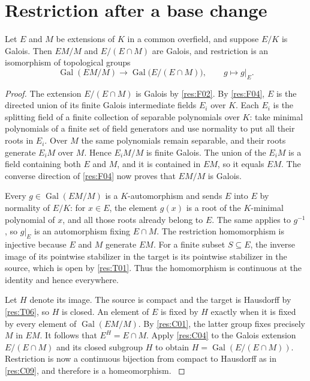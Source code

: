 \section{Restriction after a base change}

\begin{theorem}
\label{res:C10}
Let \(E\) and \(M\) be extensions of \(K\) in a common overfield,
and suppose \(E/K\) is Galois. Then \(EM/M\) and \(E/(E\cap M)\)
are Galois, and restriction is an isomorphism of topological groups
\[
  \operatorname{Gal}(EM/M)
     \longrightarrow \operatorname{Gal}\bigl(E/(E\cap M)\bigr),
     \qquad g\longmapsto g|_E .
\]
\end{theorem}

\begin{proof}
The extension \(E/(E\cap M)\) is Galois by \ref{res:F02}.
By \ref{res:F04}, \(E\) is the directed union of its finite
Galois intermediate fields \(E_i\) over \(K\). Each \(E_i\)
is the splitting field of a finite collection of separable
polynomials over \(K\): take minimal polynomials of a finite
set of field generators and use normality to put all their
roots in \(E_i\). Over \(M\) the same polynomials remain separable,
and their roots generate \(E_iM\) over \(M\). Hence \(E_iM/M\)
is finite Galois. The union of the \(E_iM\) is a field containing
both \(E\) and \(M\), and it is contained in \(EM\), so it equals
\(EM\). The converse direction of \ref{res:F04} now proves
that \(EM/M\) is Galois.

Every \(g\in\operatorname{Gal}(EM/M)\) is a \(K\)-automorphism and
sends \(E\) into \(E\) by normality of \(E/K\): for \(x\in E\),
the element \(g(x)\) is a root of the \(K\)-minimal polynomial of
\(x\), and all those roots already belong to \(E\). The same applies
to \(g^{-1}\), so \(g|_E\) is an automorphism fixing \(E\cap M\).
The restriction homomorphism is injective because \(E\) and \(M\)
generate \(EM\). For a finite subset \(S\subseteq E\), the inverse
image of its pointwise stabilizer in the target is its pointwise
stabilizer in the source, which is open by \ref{res:T01}.
Thus the homomorphism is continuous at the identity and hence
everywhere.

Let \(H\) denote its image. The source is compact and the target
is Hausdorff by \ref{res:T06}, so \(H\) is closed. An element of
\(E\) is fixed by \(H\) exactly when it is fixed by every
element of \(\operatorname{Gal}(EM/M)\). By \ref{res:C01},
the latter group fixes precisely \(M\) in \(EM\). It follows that
\(E^H=E\cap M\). Apply \ref{res:C04} to the Galois extension
\(E/(E\cap M)\) and its closed subgroup \(H\) to obtain
\(H=\operatorname{Gal}(E/(E\cap M))\). Restriction is now a
continuous bijection from compact to Hausdorff as in \ref{res:C09},
and therefore is a homeomorphism.
\cite[Proposition 7.15]{milne}
\cite[Chapter 14, finite base change]{d07}
\end{proof}

